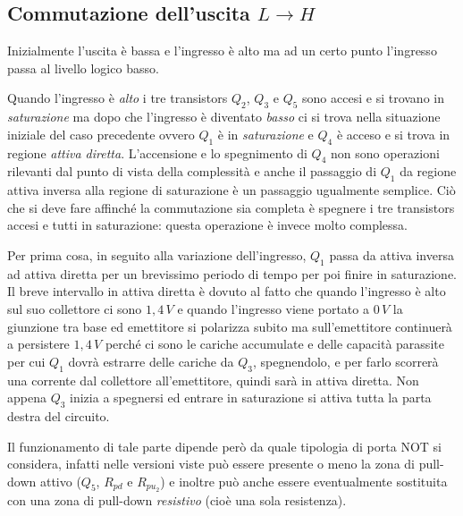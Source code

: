 \documentclass[12pt, a4paper]{report}
\begin{document}
\subsection{Commutazione dell'uscita $L \rightarrow H$}
Inizialmente l'uscita è bassa e l'ingresso è alto ma ad un certo punto l'ingresso passa al livello logico basso.

Quando l'ingresso è \textit{alto} i tre transistors $Q_2$, $Q_3$ e $Q_5$ sono accesi e si trovano in \textit{saturazione} ma dopo che l'ingresso è diventato \textit{basso} ci si trova nella situazione iniziale del caso precedente ovvero $Q_1$ è in \textit{saturazione} e $Q_4$ è acceso e si trova in regione \textit{attiva diretta}. L'accensione e lo spegnimento di $Q_4$ non sono operazioni rilevanti dal punto di vista della complessità e anche il passaggio di $Q_1$ da regione attiva inversa alla regione di saturazione è un passaggio ugualmente semplice. Ciò che si deve fare affinché la commutazione sia completa è spegnere i tre transistors accesi e tutti in saturazione: questa operazione è invece molto complessa.

Per prima cosa, in seguito alla variazione dell'ingresso, $Q_1$ passa da attiva inversa ad attiva diretta per un brevissimo periodo di tempo per poi finire in saturazione. Il breve intervallo in attiva diretta è dovuto al fatto che quando l'ingresso è alto sul suo collettore ci sono $1,4\,V$ e quando l'ingresso viene portato a $0\,V$ la giunzione tra base ed emettitore si polarizza subito ma sull'emettitore continuerà a persistere $1,4\,V$ perché ci sono le cariche accumulate e delle capacità parassite per cui $Q_1$ dovrà estrarre delle cariche da $Q_3$, spegnendolo, e per farlo scorrerà una corrente dal collettore all'emettitore, quindi sarà in attiva diretta. Non appena $Q_3$ inizia a spegnersi ed entrare in saturazione si attiva tutta la parta destra del circuito.

Il funzionamento di tale parte dipende però da quale tipologia di porta NOT si considera, infatti nelle versioni viste può essere presente o meno la zona di pull-down attivo ($Q_5$, $R_{pd}$ e $R_{pu_{2}}$) e inoltre può anche essere eventualmente sostituita con una zona di pull-down \textit{resistivo} (cioè una sola resistenza).
\end{document}
